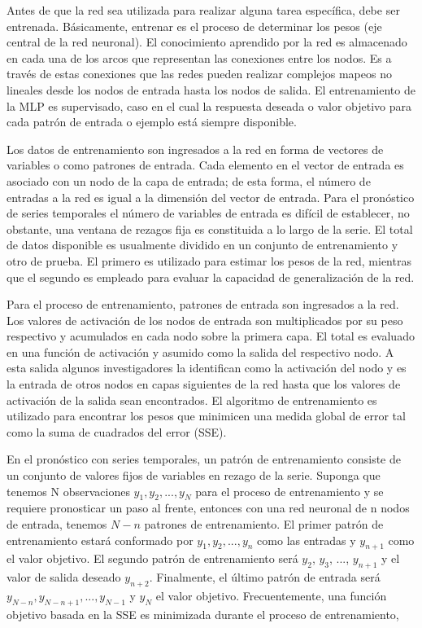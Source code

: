 \hspace*{0.4 cm} Antes de que la red sea utilizada para realizar alguna tarea espec\'ifica, debe ser entrenada. B\'asicamente, entrenar es el proceso de determinar los pesos (eje central de la red neuronal). El conocimiento aprendido por la red es almacenado en cada una de los arcos que representan las conexiones entre los nodos. Es a trav\'es de estas conexiones que las redes pueden realizar complejos mapeos no lineales desde los nodos de entrada hasta los nodos de salida. El entrenamiento de la MLP es supervisado, caso en el cual la respuesta deseada o valor objetivo para cada patr\'on de entrada o ejemplo est\'a siempre disponible.

\hspace*{0.4 cm} Los datos de entrenamiento son ingresados a la red en forma de vectores de variables o como patrones de entrada. Cada elemento en el vector de entrada es asociado con un nodo de la capa de entrada; de esta forma, el n\'umero de entradas a la red es igual a la dimensi\'on del vector de entrada. Para el pron\'ostico de series temporales el n\'umero de variables de entrada es dif\'icil de establecer, no obstante, una ventana de rezagos fija es constituida a lo largo de la serie. El total de datos disponible es usualmente dividido en un conjunto de entrenamiento y otro de prueba. El primero es utilizado para estimar los pesos de la red, mientras que el segundo es empleado para evaluar la capacidad de generalizaci\'on de la red.


\hspace*{0.4 cm} Para el proceso de entrenamiento, patrones de entrada son ingresados a la red. Los valores de activaci\'on de los nodos de entrada son multiplicados por su peso respectivo y acumulados en cada nodo sobre la primera capa. El total es evaluado en una funci\'on de activaci\'on y asumido como la salida del respectivo nodo. A esta salida algunos investigadores la identifican como la activaci\'on del nodo y es la entrada de otros nodos en capas siguientes de la red hasta que los valores de activaci\'on de la salida sean encontrados. El algoritmo de entrenamiento es utilizado para encontrar los pesos que minimicen una medida global de error tal como la suma de cuadrados del error (SSE).


\hspace*{0.4 cm} En el pron\'ostico con series temporales, un patr\'on de entrenamiento consiste de un conjunto de valores fijos de variables en rezago de la serie. Suponga que tenemos N observaciones $y_{1}, y_{2}, ..., y_{N}$ para el proceso de entrenamiento y se requiere pronosticar un paso al frente, entonces con una red neuronal de n nodos de entrada, tenemos $N-n$ patrones de entrenamiento. El primer patr\'on de entrenamiento estar\'a conformado por $y_{1}, y_{2}, ..., y_{n}$ como las entradas y $y_{n+1}$ como el valor objetivo. El segundo patr\'on de entrenamiento ser\'a $y_{2}$, $y_{3}$, ..., $y_{n+1}$ y el valor de salida deseado $y_{n+2}$. Finalmente, el \'ultimo patr\'on de entrada ser\'a $y_{N-n}, y_{N-n+1}, ..., y_{N-1}$ y $y_{N}$ el valor objetivo. Frecuentemente, una funci\'on objetivo basada en la SSE es minimizada durante el proceso de entrenamiento,

